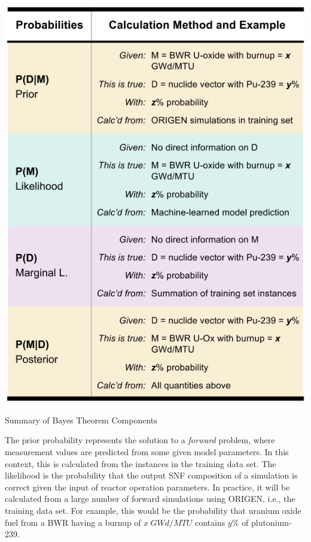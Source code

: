 \begin{table}[!hp]
  \centering
  \includegraphics[width=\linewidth]{./chapters/litrev/bayes.png}
  \caption{Summary of Bayes Theorem Components}
  \label{tbl:bayes}
\end{table}

The prior probability represents the solution to a \textit{forward} problem,
where measurement values are predicted from some given model parameters.  In
this context, this is calculated from the instances in the training data set.
The likelihood is the probability that the output \gls{SNF} composition of a
simulation is correct given the input of reactor operation parameters.  In
practice, it will be calculated from a large number of forward simulations
using \gls{ORIGEN}, i.e., the training data set. For example, this would be the
probability that uranium oxide fuel from a \gls{BWR} having a burnup of $x\
GWd/MTU$ contains $y\%$ of plutonium-239.


